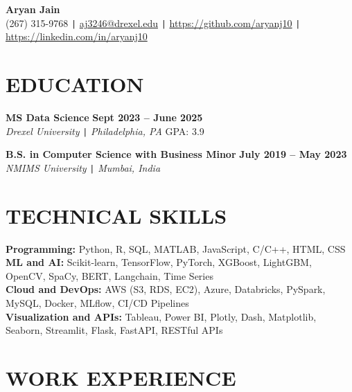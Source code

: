 \documentclass[10pt]{article}
\begin{document}
\begin{center}
    \textbf{\fontsize{18}{18}\selectfont Aryan Jain} \\
    (267) 315-9768 \texttt{|} \href{mailto:aj3246@drexel.edu}{aj3246@drexel.edu} \texttt{|}
    \href{https://github.com/aryanj10}{https://github.com/aryanj10} \texttt{|}  
    \href{https://linkedin.com/in/aryanj10}{https://linkedin.com/in/aryanj10}
\end{center}

\vspace{-0.7cm}
\section*{EDUCATION} 
\vspace{-0.2cm} 

\noindent 
\textbf{MS Data Science} \hfill \textbf{Sept 2023 -- June 2025} \\
\textit{Drexel University} \texttt{|} \textit{Philadelphia, PA} \hfill GPA: 3.9

\noindent 
\textbf{B.S. in Computer Science with Business Minor} \hfill \textbf{July 2019 --  May 2023} \\
\textit{NMIMS University} \texttt{|} \textit{Mumbai, India} 


\vspace{-0.4cm} 
\section*{TECHNICAL SKILLS} 
\vspace{-0.2cm}
\noindent
\textbf{Programming:} Python, R, SQL, MATLAB, JavaScript, C/C++, HTML, CSS \\
\textbf{ML and AI:} Scikit-learn, TensorFlow, PyTorch, XGBoost, LightGBM, OpenCV, SpaCy, BERT, Langchain, Time Series \\
\textbf{Cloud and DevOps:} AWS (S3, RDS, EC2), Azure, Databricks, PySpark, MySQL, Docker, MLflow, CI/CD Pipelines \\
\textbf{Visualization and APIs:} Tableau, Power BI, Plotly, Dash, Matplotlib, Seaborn, Streamlit, Flask, FastAPI, RESTful APIs

\vspace{-0.5cm}
\section*{WORK EXPERIENCE}
\end{document}
